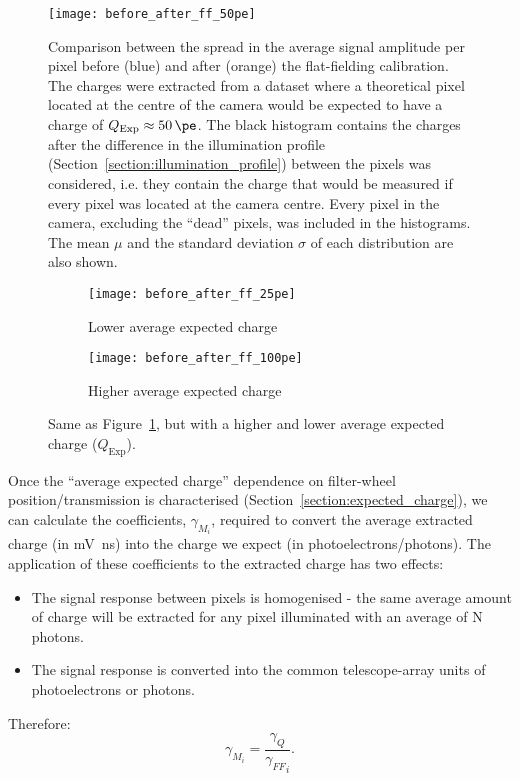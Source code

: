 \begin{figure}
	\centering
    \texttt{[image: before\_after\_ff\_50pe]} 
	\caption[Flat-field residuals.]{Comparison between the spread in the average signal amplitude per pixel before (blue) and after (orange) the flat-fielding calibration. The charges were extracted from a dataset where a theoretical pixel located at the centre of the camera would be expected to have a charge of $Q_\text{Exp} \approx \SI{50}{\pe}$. The black histogram contains the charges after the difference in the illumination profile (Section~\ref{section:illumination_profile}) between the pixels was considered, i.e. they contain the charge that would be measured if every pixel was located at the camera centre. Every pixel in the camera, excluding the ``dead'' pixels, was included in the histograms. The mean $\mu$ and the standard deviation $\sigma$ of each distribution are also shown.}
	\label{fig:before_after_ff_50pe}
\end{figure}

\begin{figure}
  \begin{subfigure}[b]{0.49\textwidth}
    \texttt{[image: before\_after\_ff\_25pe]}
    \caption{Lower average expected charge}
    \label{fig:before_after_ff_25pe}
  \end{subfigure}
  \hfill
  \begin{subfigure}[b]{0.49\textwidth}
    \texttt{[image: before\_after\_ff\_100pe]}
    \caption{Higher average expected charge}
    \label{fig:before_after_ff_100pe}
  \end{subfigure}
  \caption[Flat-field residuals at other illuminations.]{Same as Figure~\ref{fig:before_after_ff_50pe}, but with a higher and lower average expected charge ($Q_\text{Exp}$).}
\end{figure}

Once the ``average expected charge'' dependence on filter-wheel position/transmission is characterised (Section~\ref{section:expected_charge}), we can calculate the coefficients, $\gamma_{M_i}$, required to convert the average extracted charge (in \si{mV ns}) into the charge we expect (in photoelectrons/photons). The application of these coefficients to the extracted charge has two effects:
\begin{itemize}
\item The signal response between pixels is homogenised - the same average amount of charge will be extracted for any pixel illuminated with an average of N photons.
\item The signal response is converted into the common telescope-array units of photoelectrons or photons.
\end{itemize}
Therefore:
\begin{equation} \label{eq:ff}
\gamma_{M_i} = \frac{\gamma_Q}{{\gamma_{FF}}_i}.
\end{equation}

